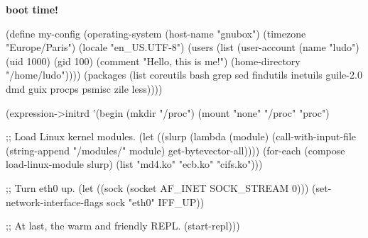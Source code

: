 \documentclass{beamer}
\begin{document}


\begin{frame}[plain]
  \begin{centering}
    \Huge{\textbf{\alert{boot time!}}}
  \end{centering}
\end{frame}

\begin{frame}
  \begin{semiverbatim}
(define my-config
  (\alert{operating-system}
   (host-name "gnubox")
   (timezone "Europe/Paris")
   (locale "en\_US.UTF-8")
   (users (list (user-account
                 (name "ludo")
                 (uid 1000) (gid 100)
                 (comment "Hello, this is me!")
                 (home-directory "/home/ludo"))))
   (packages (list coreutils bash grep sed
                   findutils inetuils
                   guile-2.0
                   dmd guix
                   procps psmisc
                   zile less))))
  \end{semiverbatim}
\end{frame}

\begin{frame}
  \begin{semiverbatim}
\small{
(\alert{expression->initrd}
 '(begin
    (mkdir "/proc")
    (mount "none" "/proc" "proc")

    ;; Load Linux kernel modules.
    (let ((slurp (lambda (module)
                   (call-with-input-file
                       (string-append "/modules/" module)
                     get-bytevector-all))))
      (for-each (compose load-linux-module slurp)
                (list "md4.ko" "ecb.ko" "cifs.ko")))

    ;; Turn eth0 up.
    (let ((sock (socket AF_INET SOCK_STREAM 0)))
      (set-network-interface-flags sock "eth0" IFF_UP))

    ;; At last, the warm and friendly REPL.
    (start-repl)))
}
  \end{semiverbatim}

\end{frame}
\end{document}
